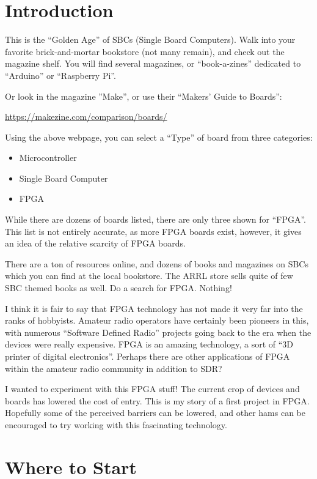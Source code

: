 \section{Introduction}

This is the ``Golden Age'' of SBCs (Single Board Computers).
Walk into your favorite brick-and-mortar bookstore (not many remain), 
and check out the magazine shelf.  You will find several magazines, or ``book-a-zines''
dedicated to ``Arduino'' or ``Raspberry Pi''.  

Or look in the magazine ''Make'', or use their ``Makers’ Guide to Boards'':

\url{https://makezine.com/comparison/boards/}

Using the above webpage, you can select a ``Type'' of board from three categories:

\begin{itemize}
	\item Microcontroller
	\item Single Board Computer
	\item FPGA
\end{itemize}

While there are dozens of boards listed, there are only three shown for ``FPGA''.
This list is not entirely accurate, as more FPGA boards exist, however, it gives
an idea of the relative scarcity of FPGA boards.

There are a ton of resources online, and dozens of books and magazines on SBCs which you can find at the local bookstore.
The ARRL store sells quite of few SBC themed books as well.  Do a search for FPGA.  Nothing!

I think it is fair to say that FPGA technology has not made it very far into the ranks of hobbyists.
Amateur radio operators have certainly been pioneers in this, with numerous ``Software Defined Radio''
projects going back to the era when the devices were really expensive.  FPGA is an amazing technology, a sort of ``3D printer of digital electronics''.  Perhaps there are other applications of FPGA within the amateur radio community in addition to SDR?

I wanted to experiment with this FPGA stuff! The current crop of devices and boards has lowered the cost of entry.  This is my story of a first project in FPGA.  Hopefully some of the perceived barriers can be lowered, and other hams can be encouraged to try working with this fascinating technology.

\section{Where to Start}

